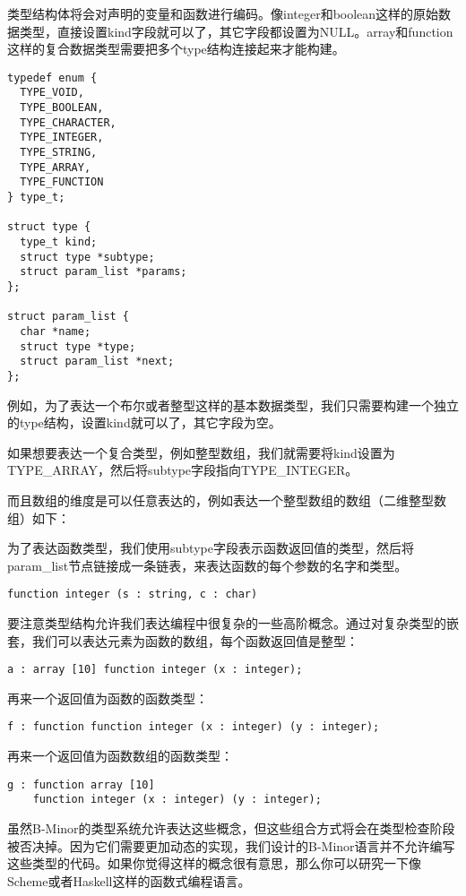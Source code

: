 \documentclass[cn,11pt,chinese]{elegantbook}
\begin{document}
类型结构体将会对声明的变量和函数进行编码。像integer和boolean这样的原始数据类型，直接设置kind字段就可以了，其它字段都设置为NULL。array和function这样的复合数据类型需要把多个type结构连接起来才能构建。

\begin{verbatim}
typedef enum {
  TYPE_VOID,
  TYPE_BOOLEAN,
  TYPE_CHARACTER,
  TYPE_INTEGER,
  TYPE_STRING,
  TYPE_ARRAY,
  TYPE_FUNCTION
} type_t;

struct type {
  type_t kind;
  struct type *subtype;
  struct param_list *params;
};

struct param_list {
  char *name;
  struct type *type;
  struct param_list *next;
};
\end{verbatim}

例如，为了表达一个布尔或者整型这样的基本数据类型，我们只需要构建一个独立的type结构，设置kind就可以了，其它字段为空。

如果想要表达一个复合类型，例如整型数组，我们就需要将kind设置为TYPE\_ARRAY，然后将subtype字段指向TYPE\_INTEGER。

而且数组的维度是可以任意表达的，例如表达一个整型数组的数组（二维整型数组）如下：

为了表达函数类型，我们使用subtype字段表示函数返回值的类型，然后将param\_list节点链接成一条链表，来表达函数的每个参数的名字和类型。

\begin{verbatim}
function integer (s : string, c : char)
\end{verbatim}

要注意类型结构允许我们表达编程中很复杂的一些高阶概念。通过对复杂类型的嵌套，我们可以表达元素为函数的数组，每个函数返回值是整型：

\begin{verbatim}
a : array [10] function integer (x : integer);
\end{verbatim}

再来一个返回值为函数的函数类型：

\begin{verbatim}
f : function function integer (x : integer) (y : integer);
\end{verbatim}

再来一个返回值为函数数组的函数类型：

\begin{verbatim}
g : function array [10]
    function integer (x : integer) (y : integer);
\end{verbatim}

虽然B-Minor的类型系统允许表达这些概念，但这些组合方式将会在类型检查阶段被否决掉。因为它们需要更加动态的实现，我们设计的B-Minor语言并不允许编写这些类型的代码。如果你觉得这样的概念很有意思，那么你可以研究一下像Scheme或者Haskell这样的函数式编程语言。
\end{document}
